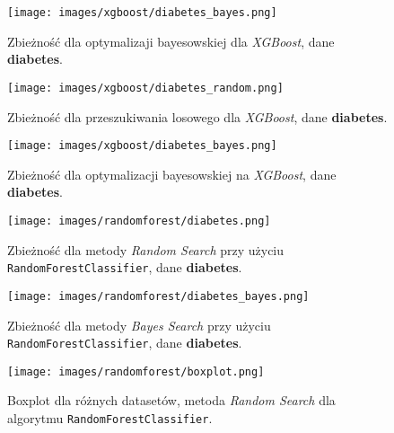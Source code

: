 \documentclass[a4paper,11pt]{article}
\begin{document}
\begin{figure}[H]
    \centering
    \texttt{[image: images/xgboost/diabetes\_bayes.png]}
    \vspace{1ex}
    \caption{Zbieżność dla optymalizaji bayesowskiej dla \textit{XGBoost}, dane \textbf{diabetes}.}
    \label{fig:xg:bayes}
\end{figure}

\begin{figure}[H]
    \centering
    \texttt{[image: images/xgboost/diabetes\_random.png]}
    \vspace{1ex}
    \caption{Zbieżność dla przeszukiwania losowego dla \textit{XGBoost}, dane \textbf{diabetes}.}
    \label{fig:xg:random}
\end{figure}

\begin{figure}[H]
    \centering
    \texttt{[image: images/xgboost/diabetes\_bayes.png]}
    \vspace{1ex}
    \caption{Zbieżność dla optymalizacji bayesowskiej na \textit{XGBoost}, dane \textbf{diabetes}.}
    \label{fig:xg:bayes}
\end{figure}


\begin{figure}[H]
    \centering
    \texttt{[image: images/randomforest/diabetes.png]}
    \vspace{1ex}
    \caption{Zbieżność dla metody \textit{Random Search} przy użyciu \texttt{RandomForestClassifier}, dane \textbf{diabetes}.}
    \label{fig:xg:random}
\end{figure}

\begin{figure}[H]
    \centering
    \texttt{[image: images/randomforest/diabetes\_bayes.png]}
    \vspace{1ex}
    \caption{Zbieżność dla metody \textit{Bayes Search} przy użyciu \texttt{RandomForestClassifier}, dane \textbf{diabetes}.}
    \label{fig:xg:random}
\end{figure}

\begin{figure}[H]
    \centering
    \texttt{[image: images/randomforest/boxplot.png]}
    \vspace{1ex}
    \caption{Boxplot dla różnych datasetów, metoda \textit{Random Search} dla algorytmu \texttt{RandomForestClassifier}.}
    \label{fig:xg:random}
\end{figure}

\newpage


\end{document}
